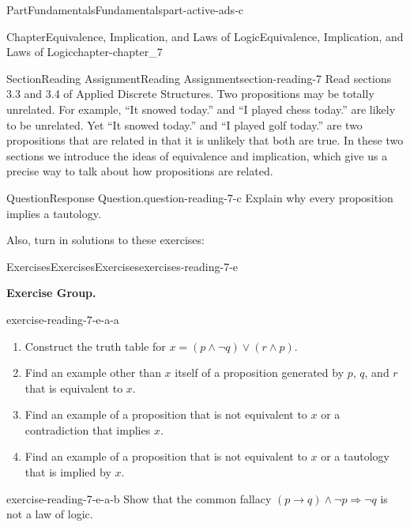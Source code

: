 \documentclass[oneside,10pt,]{book}
\numberwithin{equation}{section}
\begin{document}
\begin{partptx}{Part}{Fundamentals}{}{Fundamentals}{}{}{part-active-ads-c}
\begin{chapterptx}{Chapter}{Equivalence, Implication, and Laws of Logic}{}{Equivalence, Implication, and Laws of Logic}{}{}{chapter-chapter_7}
\begin{sectionptx}{Section}{Reading Assignment}{}{Reading Assignment}{}{}{section-reading-7}
Read sections 3.3 and 3.4 of Applied Discrete Structures. Two propositions may be totally unrelated.  For example, ``It snowed today.'' and ``I played chess today.'' are likely to be unrelated.  Yet ``It snowed today.'' and ``I played golf today.'' are two propositions that are related in that it is unlikely that both are true.  In these two sections we introduce the ideas of equivalence and implication, which give us a precise way to talk about how propositions are related.%
\begin{question}{Question}{Response Question.}{question-reading-7-c}%
Explain why every proposition implies a tautology.%
\end{question}
Also, turn in solutions to these exercises:%
%
%
\typeout{************************************************}
\typeout{************************************************}
%
\begin{exercises-subsection-numberless}{Exercises}{Exercises}{}{Exercises}{}{}{exercises-reading-7-e}
\par\medskip\noindent%
\textbf{Exercise Group.}\space\space%
\begin{exercisegroup}
\begin{divisionexerciseeg}{1}{}{}{exercise-reading-7-e-a-a}%
%
\begin{enumerate}[label=(\alph*)]
\item{}Construct the truth table for \(x= (p \land  \neg q) \lor  (r \land  p)\).%
\item{}Find an example other than \(x\) itself of a proposition generated by \(p\), \(q\), and \(r\) that is equivalent to \(x\).%
\item{}Find an example of a proposition that is not equivalent to \(x\) or a contradiction  that implies \(x\).%
\item{}Find an example of a proposition that is not equivalent to \(x\) or a tautology that is implied by \(x\).%
\end{enumerate}
%
\end{divisionexerciseeg}%
\begin{divisionexerciseeg}{2}{}{}{exercise-reading-7-e-a-b}%
Show that the common fallacy \((p\to  q) \land  \neg p \Rightarrow  \neg q\) is not a law of logic.%
\end{divisionexerciseeg}%
\end{exercisegroup}
\par\medskip\noindent
\end{exercises-subsection-numberless}
\end{sectionptx}

\end{chapterptx}
\end{partptx}
\end{document}
